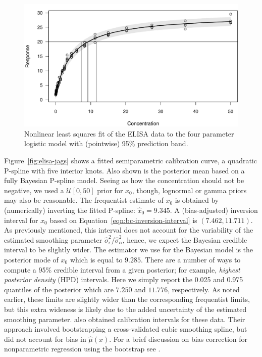 \documentclass[cmfont,usenames,dvipsnames,leqno]{afit-etd}\usepackage[]{graphicx}\usepackage[]{color}
\makeatletter
\def\maxwidth{ %
  \ifdim\Gin@nat@width>\linewidth
    \linewidth
  \else
    \Gin@nat@width
  \fi
}
\newenvironment{knitrout}{}{} %
\renewenvironment{knitrout}{\begin{singlespace}}{\end{singlespace}}
\newcommand{\mc}[1]{\ensuremath{\mathcal{#1}}}
\newcommand{\wh}[1]{\ensuremath{\widehat{#1}}}
\makeatother
\begin{document}
\begin{knitrout}
\color{fgcolor}\begin{figure}[H]

\includegraphics[width=\maxwidth]{figure/elisa-nls} \caption[Four parameter logistic model for the ELISA data]{Nonlinear least squares fit of the ELISA data to the four parameter logistic model with (pointwise) 95\% prediction band.\label{fig:elisa-nls}}
\end{figure}


\end{knitrout}


Figure~\ref{fig:elisa-jags} shows a fitted semiparametric calibration curve, a quadratic \ac{P-spline} with five interior knots. Also shown is the posterior mean based on a fully Bayesian \ac{P-spline} model. Seeing as how the concentration should not be negative, we used a $\mc{U}[0, 50]$ prior for $x_0$, though, lognormal or gamma priors may also be reasonable. The frequentist estimate of $x_0$ is obtained by (numerically) inverting the fitted \ac{P-spline}: $\wh{x}_0 = 9.345$. A (bias-adjusted) inversion interval for $x_0$ based on Equation~\eqref{eqn:bc-inversion-interval} is $(7.462, 11.711)$. As previously mentioned, this interval does not account for the variability of the estimated smoothing parameter $\wh{\sigma}_\epsilon^2/\wh{\sigma}_\alpha^2$, hence, we expect the Bayesian credible interval to be slightly wider. The estimator we use for the Bayesian model is the posterior mode of $x_0$ which is equal to $9.285$. There are a number of ways to compute a 95\% credible interval from a given posterior; for example, \textit{highest posterior density} (HPD) intervals. Here we simply report the 0.025 and 0.975 quantiles of the posterior which are $7.250$ and $11.776$, respectively. As noted earlier, these limits are slightly wider than the corresponding frequentist limits, but this extra wideness is likely due to the added uncertainty of the estimated smoothing parameter. \citet{ori_constructing_1995} also obtained calibration intervals for these data. Their approach involved bootstrapping a cross-validated cubic smoothing spline, but did not account for bias in $\wh{\mu}(x)$. For a brief discussion on bias correction for nonparametric regression using the bootstrap see \citet[pp. 362-366]{davison_bootstrap_1997}.
\end{document}
